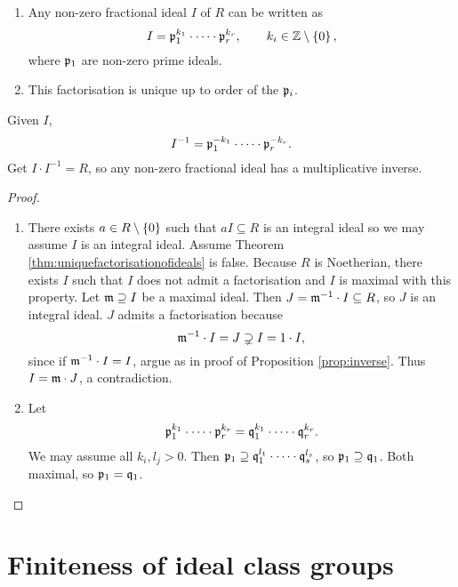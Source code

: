 \begin{theorem}
\label{thm:uniquefactorisationofideals}
\hfill
\begin{enumerate}
\item Any non-zero fractional ideal $ I $ of $ R $ can be written as
$$ I = \pp_1^{k_1} \cdot \dots \cdot \pp_r^{k_r}, \qquad k_i \in \Z \setminus \cbr{0}, $$
where $ \mathfrak{p}_1 $ are non-zero prime ideals.
\item This factorisation is unique up to order of the $ \mathfrak{p}_i $.
\end{enumerate}
\end{theorem}

\begin{remark*}
Given $ I $,
$$ I^{-1} = \mathfrak{p}_1^{-k_1} \cdot \dots \cdot \mathfrak{p}_r^{-k_r}. $$
Get $ I \cdot I^{-1} = R $, so any non-zero fractional ideal has a multiplicative inverse.
\end{remark*}

\begin{proof}
\hfill
\begin{enumerate}
\item There exists $ a \in R \setminus \cbr{0} $ such that $ aI \subseteq R $ is an integral ideal so we may assume $ I $ is an integral ideal. Assume Theorem \ref{thm:uniquefactorisationofideals} is false. Because $ R $ is Noetherian, there exists $ I $ such that $ I $ does not admit a factorisation and $ I $ is maximal with this property. Let $ \mathfrak{m} \supseteq I $ be a maximal ideal. Then $ J = \mathfrak{m}^{-1} \cdot I \subseteq R $, so $ J $ is an integral ideal. $ J $ admits a factorisation because
$$ \mathfrak{m}^{-1} \cdot I = J \supsetneq I = 1 \cdot I, $$
since if $ \mathfrak{m}^{-1} \cdot I = I $, argue as in proof of Proposition \ref{prop:inverse}. Thus $ I = \mathfrak{m} \cdot J $, a contradiction.
\item Let
$$ \mathfrak{p}_1^{k_1} \cdot \dots \cdot \mathfrak{p}_r^{k_r} = \mathfrak{q}_1^{k_1} \cdot \dots \cdot \mathfrak{q}_r^{k_r}. $$
We may assume all $ k_i, l_j > 0 $. Then $ \mathfrak{p}_1 \supseteq \mathfrak{q}_1^{l_1} \cdot \dots \cdot \mathfrak{q}_s^{l_s} $, so $ \mathfrak{p}_1 \supseteq \mathfrak{q}_1 $. Both maximal, so $ \mathfrak{p}_1 = \mathfrak{q}_1 $.
\end{enumerate}
\end{proof}

\pagebreak

\section{Finiteness of ideal class groups}

